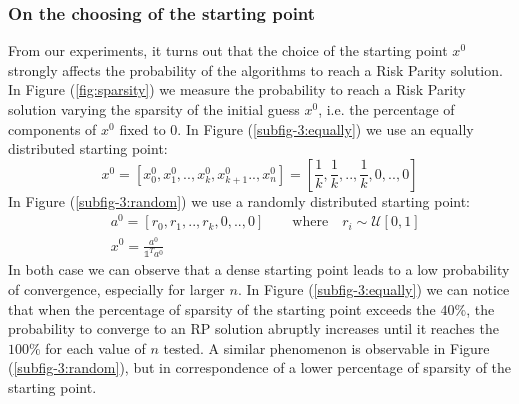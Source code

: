 \subsubsection{On the choosing of the starting point}
From our experiments, it turns out that the choice of the starting point $x^0$ strongly affects the probability of the algorithms to reach a Risk Parity solution.  In Figure (\ref{fig:sparsity}) we measure the probability to reach a Risk Parity solution varying the sparsity of the initial guess $x^0$, i.e. the percentage of components of $x^0$ fixed to 0. In Figure (\ref{subfig-3:equally}) we use an equally distributed starting point:
\begin{equation}
x^{0} = \left[x^{0}_0, x^{0}_1, .. ,  x^{0}_k, x^{0}_{k+1} .., x^{0}_n \right] = \left[\frac{1}{k}, \frac{1}{k}, .., \frac{1}{k}, 0, .., 0 \right]
\end{equation}
In Figure (\ref{subfig-3:random}) we use a randomly distributed starting point:
\begin{equation}
\begin{aligned}
&a^{0} = \left[r_0, r_1, ..,r_k, 0, .., 0 \right] \qquad \text{where} \quad r_i \sim \mathcal{U}[0,1]\\
&x^0 = \frac{a^{0}}{\mathds{1}^T a^0}
\end{aligned}
\end{equation}
In both case we can observe that a dense starting point leads to a low probability of convergence, especially for larger $n$. In Figure (\ref{subfig-3:equally}) we can notice that when the percentage of sparsity of the starting point exceeds the $40\%$, the probability to converge to an RP solution abruptly increases until it reaches the $100\%$ for each value of $n$ tested. A similar phenomenon is observable in Figure (\ref{subfig-3:random}), but in correspondence of a lower percentage of sparsity of the starting point.

